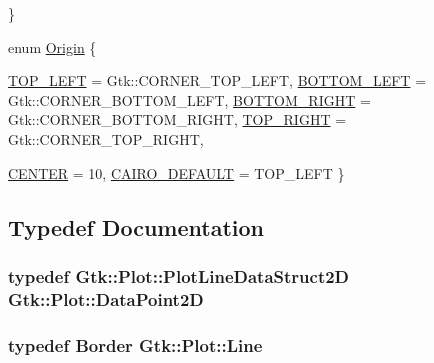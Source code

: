 \begin{DoxyCompactItemize}
 \}
\item 
enum \hyperlink{namespaceGtk_1_1Plot_a0ce4e6f495df606dd5b947ea1512490f}{Origin} \{ \par
\hyperlink{namespaceGtk_1_1Plot_a0ce4e6f495df606dd5b947ea1512490fa98fa5422cd004789dd6ffa177dbbf9c1}{TOP\_\-LEFT} =  Gtk::CORNER\_\-TOP\_\-LEFT, 
\hyperlink{namespaceGtk_1_1Plot_a0ce4e6f495df606dd5b947ea1512490fae8c1087d3c4fb149d4a01649b3922526}{BOTTOM\_\-LEFT} =  Gtk::CORNER\_\-BOTTOM\_\-LEFT, 
\hyperlink{namespaceGtk_1_1Plot_a0ce4e6f495df606dd5b947ea1512490fa0c3adfc8278441f683b401245ec66130}{BOTTOM\_\-RIGHT} =  Gtk::CORNER\_\-BOTTOM\_\-RIGHT, 
\hyperlink{namespaceGtk_1_1Plot_a0ce4e6f495df606dd5b947ea1512490fa8615d5a4ef038ffb006b7a6dc3d07101}{TOP\_\-RIGHT} =  Gtk::CORNER\_\-TOP\_\-RIGHT, 
\par
\hyperlink{namespaceGtk_1_1Plot_a0ce4e6f495df606dd5b947ea1512490fa10b97cf832233cb157c484900e6375af}{CENTER} =  10, 
\hyperlink{namespaceGtk_1_1Plot_a0ce4e6f495df606dd5b947ea1512490faec9bc95faf6c238679ed5c2c6338185f}{CAIRO\_\-DEFAULT} =  TOP\_\-LEFT
 \}
\end{DoxyCompactItemize}


\subsection{Typedef Documentation}
\hypertarget{namespaceGtk_1_1Plot_abea92d3a790b1bcf6a64f98511231815}{
\subsubsection[{DataPoint2D}]{\setlength{\rightskip}{0pt plus 5cm}typedef  {\bf Gtk::Plot::PlotLineDataStruct2D}  {\bf Gtk::Plot::DataPoint2D}}}
\label{namespaceGtk_1_1Plot_abea92d3a790b1bcf6a64f98511231815}
\hypertarget{namespaceGtk_1_1Plot_a9b9ee0ab9bbec47945b0bf70f30ea308}{
\subsubsection[{Line}]{\setlength{\rightskip}{0pt plus 5cm}typedef {\bf Border} {\bf Gtk::Plot::Line}}}
\label{namespaceGtk_1_1Plot_a9b9ee0ab9bbec47945b0bf70f30ea308}


